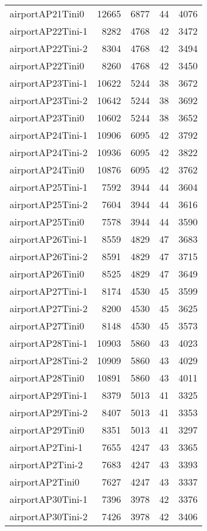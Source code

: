 \documentclass[../../../thesis.tex]{subfiles}
\begin{document}
\begin{longtable}{lrrrr}
airportAP21Tini0 & 12665 & 6877 & 44 & 4076 \\
airportAP22Tini-1 & 8282 & 4768 & 42 & 3472 \\
airportAP22Tini-2 & 8304 & 4768 & 42 & 3494 \\
airportAP22Tini0 & 8260 & 4768 & 42 & 3450 \\
airportAP23Tini-1 & 10622 & 5244 & 38 & 3672 \\
airportAP23Tini-2 & 10642 & 5244 & 38 & 3692 \\
airportAP23Tini0 & 10602 & 5244 & 38 & 3652 \\
airportAP24Tini-1 & 10906 & 6095 & 42 & 3792 \\
airportAP24Tini-2 & 10936 & 6095 & 42 & 3822 \\
airportAP24Tini0 & 10876 & 6095 & 42 & 3762 \\
airportAP25Tini-1 & 7592 & 3944 & 44 & 3604 \\
airportAP25Tini-2 & 7604 & 3944 & 44 & 3616 \\
airportAP25Tini0 & 7578 & 3944 & 44 & 3590 \\
airportAP26Tini-1 & 8559 & 4829 & 47 & 3683 \\
airportAP26Tini-2 & 8591 & 4829 & 47 & 3715 \\
airportAP26Tini0 & 8525 & 4829 & 47 & 3649 \\
airportAP27Tini-1 & 8174 & 4530 & 45 & 3599 \\
airportAP27Tini-2 & 8200 & 4530 & 45 & 3625 \\
airportAP27Tini0 & 8148 & 4530 & 45 & 3573 \\
airportAP28Tini-1 & 10903 & 5860 & 43 & 4023 \\
airportAP28Tini-2 & 10909 & 5860 & 43 & 4029 \\
airportAP28Tini0 & 10891 & 5860 & 43 & 4011 \\
airportAP29Tini-1 & 8379 & 5013 & 41 & 3325 \\
airportAP29Tini-2 & 8407 & 5013 & 41 & 3353 \\
airportAP29Tini0 & 8351 & 5013 & 41 & 3297 \\
airportAP2Tini-1 & 7655 & 4247 & 43 & 3365 \\
airportAP2Tini-2 & 7683 & 4247 & 43 & 3393 \\
airportAP2Tini0 & 7627 & 4247 & 43 & 3337 \\
airportAP30Tini-1 & 7396 & 3978 & 42 & 3376 \\
airportAP30Tini-2 & 7426 & 3978 & 42 & 3406 \\

\end{longtable}
\end{document}
